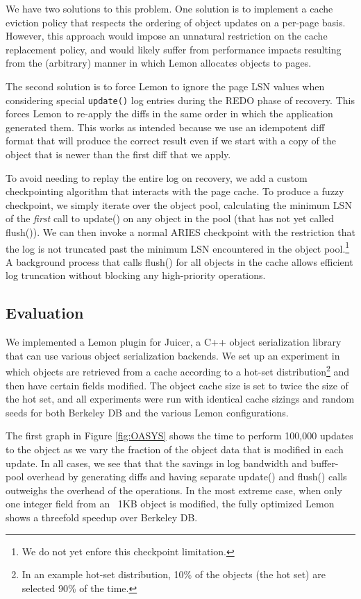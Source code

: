 \documentclass[letterpaper,twocolumn,english]{article}
\newcommand{\yad}{Lemon\xspace}
\newcommand{\oasys}{Juicer\xspace}
\begin{document}
We have two solutions to this problem.  One solution is to
implement a cache eviction policy that respects the ordering of object
updates on a per-page basis.  
However, this approach would impose an unnatural restriction on the
cache replacement policy, and would likely suffer from performance
impacts resulting from the (arbitrary) manner in which \yad allocates
objects to pages.

The second solution is to 
force \yad to ignore the page LSN values when considering
special {\tt update()} log entries during the REDO phase of recovery.  This
forces \yad to re-apply the diffs in the same order in which the application
generated them.  This works as intended because we use an
idempotent diff format that will produce the correct result even if we
start with a copy of the object that is newer than the first diff that
we apply.

To avoid needing to replay the entire log on recovery, we add a custom
checkpointing algorithm that interacts with the page cache.  
To produce a
fuzzy checkpoint, we simply iterate over the object pool, calculating
the minimum LSN of the {\em first} call to update() on any object in
the pool (that has not yet called flush()). 
We can then invoke a normal ARIES checkpoint with the restriction
that the log is not truncated past the minimum LSN encountered in the
object pool.\footnote{We do not yet enfore this checkpoint limitation.}
A background process that calls flush() for all objects in the cache
allows efficient log truncation without blocking any high-priority 
operations.

\subsection{Evaluation}

We implemented a \yad plugin for \oasys, a C++ object serialization
library that can use various object serialization backends. 
We set up an experiment in which objects are
retrieved from a cache according to a hot-set distribution\footnote{In
an example hot-set distribution, 10\% of the objects (the hot set) are
selected 90\% of the time.} and then have certain fields modified. The
object cache size is set to twice the size of the hot set, and all
experiments were run with identical cache sizings and random seeds for
both Berkeley DB and the various \yad configurations.

The first graph in Figure \ref{fig:OASYS} shows the time to perform
100,000 updates to the object as we vary the fraction of the object
data that is modified in each update. In all
cases, we see that that the savings in log bandwidth and
buffer-pool overhead by generating diffs and having separate 
update() and flush() calls outweighs the overhead of the operations.
In the most extreme case, when
only one integer field from an ~1KB object is modified, the fully
optimized \yad shows a threefold speedup over Berkeley DB. 
\end{document}
